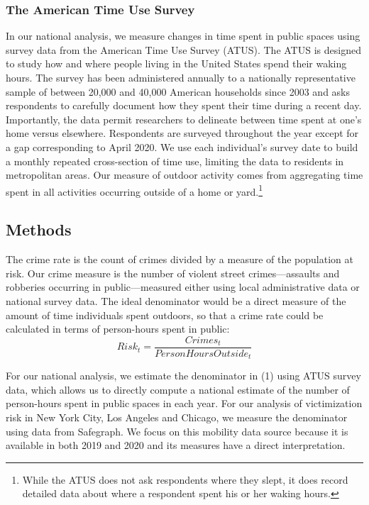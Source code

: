 \documentclass[12pt]{article}
\begin{document}
\subsubsection{The American Time Use Survey}
In our national analysis, we measure changes in time spent in public spaces using survey data from the American Time Use Survey (ATUS). The ATUS is designed to study how and where people living in the United States spend their waking hours. The survey has been administered annually to a nationally representative sample of between 20,000 and 40,000 American households since 2003 and asks respondents to carefully document how they spent their time during a recent day. Importantly, the data permit researchers to delineate between time spent at one's home versus elsewhere. Respondents are surveyed throughout the year except for a gap corresponding to April 2020. We use each individual's survey date to build a monthly repeated cross-section of time use, limiting the data to residents in metropolitan areas. Our measure of outdoor activity comes from aggregating time spent in all activities occurring outside of a home or yard.\footnote{While the ATUS does not ask respondents where they slept, it does record detailed data about where a respondent spent his or her waking hours.} 

\subsection{Methods}
The crime rate is the count of crimes divided by a measure of the population at risk. Our crime measure is the number of violent street crimes---assaults and robberies occurring in public---measured either using local administrative data or national survey data. The ideal denominator would be a direct measure of the amount of time individuals spent outdoors, so that a crime rate could be calculated in terms of person-hours spent in public: 
\begin{equation}
Risk_t = \frac{Crimes_t}{PersonHoursOutside_t}
\end{equation}

For our national analysis, we estimate the denominator in (1) using ATUS survey data, which allows us to directly compute a national estimate of the number of person-hours spent in public spaces in each year. For our analysis of victimization risk in New York City, Los Angeles and Chicago, we measure the denominator using data from Safegraph. We focus on this mobility data source because it is available in both 2019 and 2020 and its measures have a direct interpretation.
\end{document}
